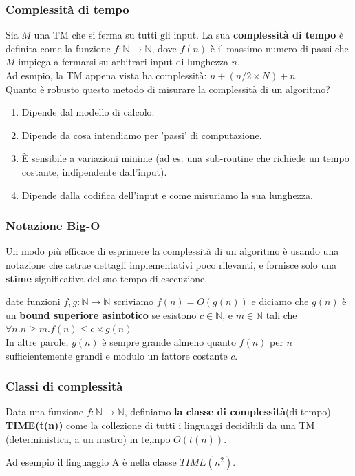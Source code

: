 \documentclass[a4paper, 12pt]{article}
\begin{document}
\subsubsection{Complessit\`a di tempo}
Sia $M$ una TM che si ferma su tutti gli input. La sua \textbf{complessit\`a di tempo} \`e definita come la funzione $f: \mathbb{N} \rightarrow \mathbb{N}$, dove $f(n)$ \`e il massimo numero di passi che $M$ impiega a fermarsi su arbitrari input di lunghezza $n$.\\
Ad esmpio, la TM appena vista ha complessit\`a: $n + (n/2 \times N) + n$\\
Quanto \`e robusto questo metodo di misurare la complessit\`a di un algoritmo?
\begin{enumerate}
\item Dipende dal modello di calcolo.
\item Dipende da cosa intendiamo per 'passi' di computazione.
\item \`E sensibile a variazioni minime (ad es. una sub-routine che richiede un tempo costante, indipendente dall'input).
\item Dipende dalla codifica dell'input e come misuriamo la sua lunghezza.
\end{enumerate}

\subsubsection{Notazione Big-O}
Un modo pi\`u efficace di esprimere la complessit\`a  di un algoritmo \`e usando una notazione che astrae dettagli implementativi poco rilevanti, e fornisce solo una \textbf{stime} significativa del suo tempo di esecuzione.
\begin{center}
date funzioni $f,g: \mathbb{N} \rightarrow \mathbb{N}$ scriviamo $f(n) = O(g(n))$ e diciamo che $g(n)$ \`e un \textbf{bound superiore asintotico} se esistono $c \in \mathbb{N}$, e $m \in \mathbb{N}$ tali che $\forall n. n \geq m. f(n) \leq c \times g(n)$\\In altre parole, $g(n)$ \`e sempre grande almeno quanto $f(n)$ per $n$ sufficientemente grandi e modulo un fattore costante $c$.
\end{center}

\subsubsection{Classi di complessit\`a}
\begin{center}
Data una funzione $f: \mathbb{N} \rightarrow \mathbb{N}$, definiamo \textbf{la classe di complessit\`a}(di tempo) \textbf{TIME(t(n))} come la collezione di tutti i linguaggi decidibili da una TM (deterministica, a un nastro) in te,mpo $O(t(n))$.
\end{center}
Ad esempio il linguaggio A \`e nella classe $TIME(n^{2})$.
\end{document}

